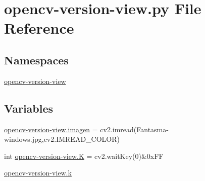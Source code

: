 \hypertarget{opencv-version-view_8py}{}\section{opencv-\/version-\/view.py File Reference}
\label{opencv-version-view_8py}
\subsection*{Namespaces}
\begin{DoxyCompactItemize}
\item 
 \hyperlink{namespaceopencv-version-view}{opencv-\/version-\/view}
\end{DoxyCompactItemize}
\subsection*{Variables}
\begin{DoxyCompactItemize}
\item 
\hyperlink{namespaceopencv-version-view_a66a58f703e807f162b987835e63ac204}{opencv-\/version-\/view.\+imagen} = cv2.\+imread(\textquotesingle{}Fantasma-\/windows.\+jpg\textquotesingle{},cv2.\+I\+M\+R\+E\+A\+D\+\_\+\+C\+O\+L\+OR)
\item 
int \hyperlink{namespaceopencv-version-view_a59ebc577f16d2a8e4f47e63bdd8ed15e}{opencv-\/version-\/view.\+K} = cv2.\+wait\+Key(0)\&0x\+FF
\item 
\hyperlink{namespaceopencv-version-view_a9a0c0708fca0c8961fc6fdc34240ebed}{opencv-\/version-\/view.\+k}
\end{DoxyCompactItemize}
